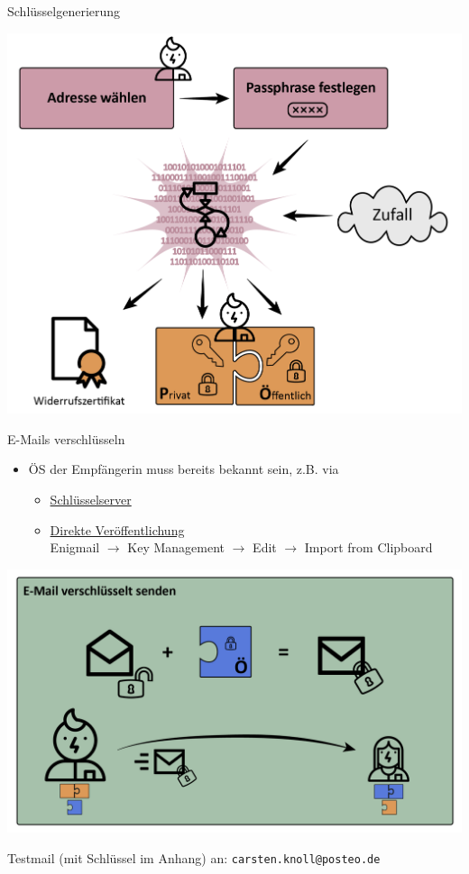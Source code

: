 \documentclass{beamer}
\begin{document}

\begin{frame}{Schlüsselgenerierung}
  \begin{center}
  \includegraphics[width=.8\textwidth]{img-src/pgp_keygen.png}
  \end{center}
\end{frame}


\begin{frame}[label=ver1]{E-Mails verschlüsseln}
\begin{itemize}
 \item ÖS der Empfängerin muss bereits bekannt sein, z.B. via
 \begin{itemize}
  \item \href{https://pgp.mit.edu/}{Schlüsselserver}
  \item \href{https://cknoll.github.io/files/pub-key-carsten.txt}{Direkte Veröffentlichung}
  \\ {\tiny Enigmail $\rightarrow$ Key Management $\rightarrow$ Edit $\rightarrow$ Import from Clipboard}
 \end{itemize}
\end{itemize}


  \begin{center}
  \includegraphics[width=.8\textwidth]{img-src/pgp_enc.png}
  \end{center}

  Testmail (mit Schlüssel im Anhang) an: {\footnotesize \texttt{carsten.knoll@posteo.de}}

\end{frame}
\end{document}
